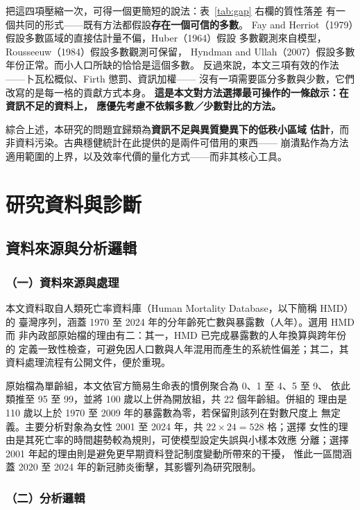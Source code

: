\documentclass[UTF8, fontset=macnew, a4paper, 12pt]{ctexart}
\begin{document}
把這四項壓縮一次，可得一個更簡短的說法：表~\ref{tab:gap} 右欄的質性落差
有一個共同的形式——既有方法都假設\textbf{存在一個可信的多數}。
Fay and Herriot（1979）假設多數區域的直接估計量不偏，Huber（1964）假設
多數觀測來自模型，Rousseeuw（1984）假設多數觀測可保留，
Hyndman and Ullah（2007）假設多數年份正常。而小人口所缺的恰恰是這個多數。
反過來說，本文三項有效的作法——卜瓦松概似、Firth 懲罰、資訊加權——
沒有一項需要區分多數與少數，它們改寫的是每一格的貢獻方式本身。
\textbf{這是本文對方法選擇最可操作的一條啟示：在資訊不足的資料上，
應優先考慮不依賴多數／少數對比的方法。}

綜合上述，本研究的問題宜歸類為\textbf{資訊不足與異質變異下的低秩小區域
估計}，而非資料污染。古典穩健統計在此提供的是兩件可借用的東西——
崩潰點作為方法適用範圍的上界，以及效率代價的量化方式——而非其核心工具。

\section{研究資料與診斷}

\subsection{資料來源與分析邏輯}

\subsubsection{（一）資料來源與處理}

本文資料取自人類死亡率資料庫（Human Mortality Database，以下簡稱 HMD）的
臺灣序列，涵蓋 1970 至 2024 年的分年齡死亡數與暴露數（人年）。選用 HMD 而
非內政部原始檔的理由有二：其一，HMD 已完成暴露數的人年換算與跨年份的
定義一致性檢查，可避免因人口數與人年混用而產生的系統性偏差；其二，其
資料處理流程有公開文件，便於重現。

原始檔為單齡組，本文依官方簡易生命表的慣例聚合為 0、1 至 4、5 至 9、
依此類推至 95 至 99，並將 100 歲以上併為開放組，共 22 個年齡組。併組的
理由是 110 歲以上於 1970 至 2009 年的暴露數為零，若保留則該列在對數尺度上
無定義。主要分析對象為女性 2001 至 2024 年，共 $22\times24=528$ 格；選擇
女性的理由是其死亡率的時間趨勢較為規則，可使模型設定失誤與小樣本效應
分離；選擇 2001 年起的理由則是避免更早期資料登記制度變動所帶來的干擾，
惟此一區間涵蓋 2020 至 2024 年的新冠肺炎衝擊，其影響列為研究限制。

\subsubsection{（二）分析邏輯}
\end{document}
